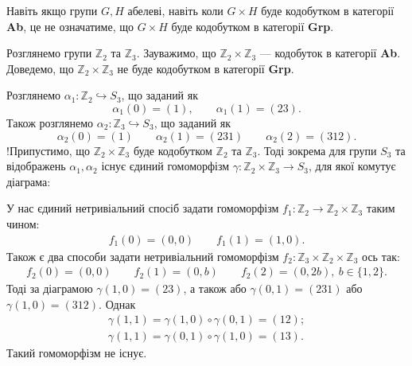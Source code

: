 \documentclass{math_library}
\begin{document}
\begin{remark}
Навіть якщо групи $G,H$ абелеві, навіть коли $G \times H$ буде кодобутком в категорії \textbf{Ab}, це не означатиме, що $G \times H$ буде кодобутком в категорії \textbf{Grp}.
\end{remark}

\begin{example}
Розглянемо групи $\mathbb{Z}_2$ та $\mathbb{Z}_3$. Зауважимо, що $\mathbb{Z}_2 \times \mathbb{Z}_3$ --- кодобуток в категорії \textbf{Ab}. Доведемо, що $\mathbb{Z}_2 \times \mathbb{Z}_3$ не буде кодобутком в категорії \textbf{Grp}.

Розглянемо $\alpha_1 \colon \mathbb{Z}_2 \hookrightarrow S_3$, що заданий як \[
\alpha_1(0) = (1), \qquad \alpha_1(1) = (23).\] Також розглянемо $\alpha_2 \colon \mathbb{Z}_3 \hookrightarrow S_3$, що заданий як \[
\alpha_2(0) = (1) \qquad \alpha_2(1) = (231) \qquad \alpha_2(2) = (312).
\]
!Припустимо, що $\mathbb{Z}_2 \times \mathbb{Z}_3$ буде кодобутком $\mathbb{Z}_2$ та $\mathbb{Z}_3$. Тоді зокрема для групи $S_3$ та відображень $\alpha_1,\alpha_2$ існує єдиний гомоморфізм $\gamma \colon \mathbb{Z}_2 \times \mathbb{Z}_3 \to S_3$, для якої комутує діаграма:
\begin{figure}[H]
\centering
{}
\end{figure}
У нас єдиний нетривіальний спосіб задати гомоморфізм $f_1 \colon \mathbb{Z}_2 \to \mathbb{Z}_2 \times \mathbb{Z}_3$ таким чином:
\begin{align*}
f_1(0) = (0,0) \qquad f_1(1) = (1,0).
\end{align*}
Також є два способи задати нетривіальний гомоморфізм $f_2 \colon \mathbb{Z}_3 \times \mathbb{Z}_2 \times \mathbb{Z}_3$ ось так:
\begin{align*}
f_2(0) = (0,0) \qquad f_2(1) = (0,b) \qquad f_2(2) = (0,2b),\ b \in \{1,2\}.
\end{align*}
Тоді за діаграмою $\gamma(1,0) = (23)$, а також або $\gamma(0,1) = (231)$ або $\gamma(1,0) = (312)$. Однак
\begin{align*}
\gamma(1,1) = \gamma(1,0) \circ \gamma(0,1) = (12); \\
\gamma(1,1) = \gamma(0,1) \circ \gamma(1,0) = (13).
\end{align*}
Такий гомоморфізм не існує.
\end{example}
\end{document}

